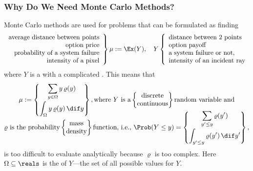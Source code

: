 \documentclass[10pt,compress,xcolor={usenames,dvipsnames}]{beamer} %
\begin{document}
\begin{frame}
\frametitle{Why Do We Need Monte Carlo Methods?}
\vspace{-2ex}
Monte Carlo methods are used for problems that can be formulated as finding 
\[
\left . \begin{array}{r}\text{average distance between points} \\ 
\text{option price} \\ 
\text{probability of a system failure} \\ 
\text{intensity of a pixel} \end{array} \right \}
\mu := \Ex(Y), \quad Y\left \{ \begin{array}{l}\text{distance between 2  points} \\
\text{option payoff} \\ 
\text{a system failure or not, } \\ 
\text{intensity of an incident ray} \end{array} \right .
\]
where $Y$ is a  with a \alert{complicated} .  This means that
\begin{multline*}
\mu := \begin{Bmatrix}\displaystyle
\sum_{y \in \Omega} y \, \varrho(y) \\[3ex]
\displaystyle
\int_{\Omega} y \, \varrho(y) \, \dif y 
\end{Bmatrix},
\text{where $Y$ is a}
\begin{Bmatrix}
\text{discrete} \\
\text{continuous}
\end{Bmatrix}
\text{random variable and} \\[-3ex]
\varrho \text{ is the probability}
\begin{Bmatrix}
\text{mass} \\
\text{density}
\end{Bmatrix}
\text{function, i.e., }\Prob(Y \le y) = 
\begin{Bmatrix}\displaystyle
\sum_{y' \le y} \varrho(y') \\[3ex]
\displaystyle
\int_{y' \le y} \varrho(y') \, \dif y' 
\end{Bmatrix},
\end{multline*}
is too difficult to evaluate analytically because $\varrho$ is too complex.  Here $\Omega 
\subseteq \reals$ is the 
  of 
$Y$---the set of all possible values for $Y$.  

\end{frame}
\end{document}
